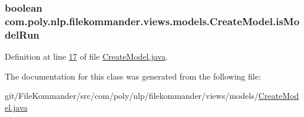 \hypertarget{classcom_1_1poly_1_1nlp_1_1filekommander_1_1views_1_1models_1_1_create_model_ac8bed5b351f8c89a81528625298453a3}{
\subsubsection[{is\-Model\-Run}]{\setlength{\rightskip}{0pt plus 5cm}boolean com.\-poly.\-nlp.\-filekommander.\-views.\-models.\-Create\-Model.\-is\-Model\-Run\hspace{0.3cm}{\ttfamily [private]}}}\label{classcom_1_1poly_1_1nlp_1_1filekommander_1_1views_1_1models_1_1_create_model_ac8bed5b351f8c89a81528625298453a3}


Definition at line \hyperlink{L17}{17} of file \hyperlink{}{Create\-Model.\-java}.



The documentation for this class was generated from the following file\-:\begin{DoxyCompactItemize}
\item 
git/\-File\-Kommander/src/com/poly/nlp/filekommander/views/models/\hyperlink{_create_model_8java}{Create\-Model.\-java}\end{DoxyCompactItemize}
